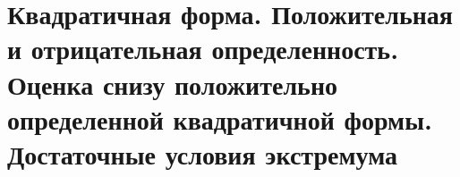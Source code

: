 \section{Квадратичная форма. Положительная и отрицательная определенность. Оценка снизу положительно определенной квадратичной формы. Достаточные условия экстремума}
